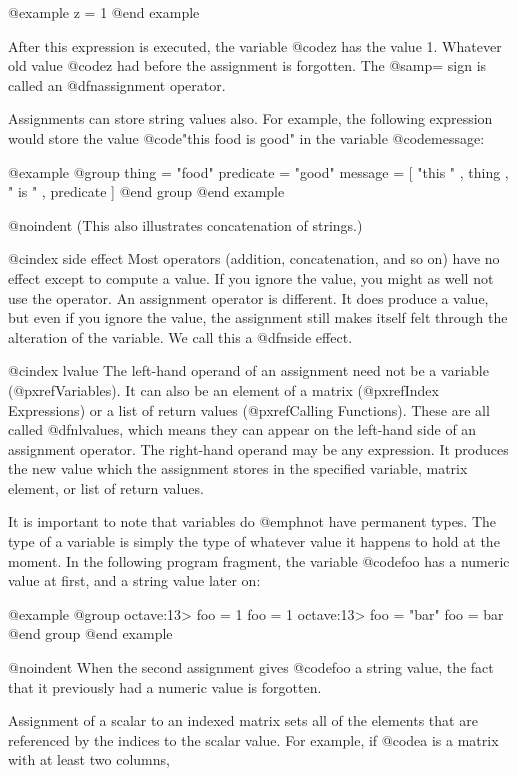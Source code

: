 @example
z = 1
@end example

After this expression is executed, the variable @code{z} has the value 1.
Whatever old value @code{z} had before the assignment is forgotten.
The @samp{=} sign is called an @dfn{assignment operator}.

Assignments can store string values also.  For example, the following
expression would store the value @code{"this food is good"} in the
variable @code{message}:

@example
@group
thing = "food"
predicate = "good"
message = [ "this " , thing , " is " , predicate ]
@end group
@end example

@noindent
(This also illustrates concatenation of strings.)

@cindex side effect
Most operators (addition, concatenation, and so on) have no effect
except to compute a value.  If you ignore the value, you might as well
not use the operator.  An assignment operator is different.  It does
produce a value, but even if you ignore the value, the assignment still
makes itself felt through the alteration of the variable.  We call this
a @dfn{side effect}.

@cindex lvalue
The left-hand operand of an assignment need not be a variable
(@pxref{Variables}).  It can also be an element of a matrix
(@pxref{Index Expressions}) or a list of return values
(@pxref{Calling Functions}).  These are all called @dfn{lvalues}, which
means they can appear on the left-hand side of an assignment operator.
The right-hand operand may be any expression.  It produces the new value
which the assignment stores in the specified variable, matrix element,
or list of return values.

It is important to note that variables do @emph{not} have permanent types.
The type of a variable is simply the type of whatever value it happens
to hold at the moment.  In the following program fragment, the variable
@code{foo} has a numeric value at first, and a string value later on:

@example
@group
octave:13> foo = 1
foo = 1
octave:13> foo = "bar"
foo = bar
@end group
@end example

@noindent
When the second assignment gives @code{foo} a string value, the fact that
it previously had a numeric value is forgotten.

Assignment of a scalar to an indexed matrix sets all of the elements
that are referenced by the indices to the scalar value.  For example, if
@code{a} is a matrix with at least two columns,


